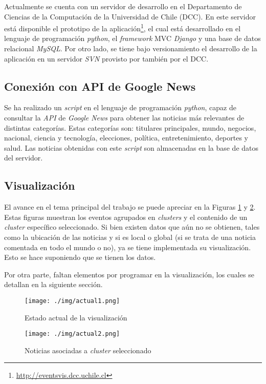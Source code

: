 \documentclass[10pt]{article}
\begin{document}
	Actualmente se cuenta con un servidor de desarrollo en el Departamento de Ciencias de la Computación de la Universidad de Chile (DCC). En este servidor está disponible el prototipo de la aplicación\footnote{\url{http://eventsvis.dcc.uchile.cl}}, el cual está desarrollado en el lenguaje de programación \emph{python}, el \emph{framework} MVC \emph{Django} y una base de datos relacional \emph{MySQL}. Por otro lado, se tiene bajo versionamiento el desarrollo de la aplicación en un servidor \emph{SVN} provisto por también por el DCC.

\subsection{Conexión con API de Google News}

Se ha realizado un \emph{script} en el lenguaje de programación \emph{python}, capaz de consultar la \emph{API} de \emph{Google News} para obtener las noticias más relevantes de distintas categorías. Estas categorías son: titulares principales, mundo, negocios, nacional, ciencia y tecnología, elecciones, política, entretenimiento, deportes y salud. Las noticias obtenidas con este \emph{script} son almacenadas en la base de datos del servidor.

\subsection{Visualización}

	El avance en el tema principal del trabajo se puede apreciar en la Figuras \ref{actual1} y  \ref{actual2}. Estas figuras muestran los eventos agrupados en \emph{clusters} y el contenido de un \emph{cluster} específico seleccionado. Si bien existen datos que aún no se obtienen, tales como la ubicación de las noticias y si es local o global (si se trata de una noticia comentada en todo el mundo o no), ya se tiene implementada su visualización. Esto se hace suponiendo que se tienen los datos.

	Por otra parte, faltan elementos por programar en la visualización, los cuales se detallan en la siguiente sección.

\begin{figure}[h!]
	\centering
    \texttt{[image: ./img/actual1.png]}
	\caption{Estado actual de la visualización}
	\label{actual1}
\end{figure}

\begin{figure}[h!]
	\centering
    \texttt{[image: ./img/actual2.png]}
	\caption{Noticias asociadas a \emph{cluster} seleccionado}
	\label{actual2}
\end{figure}
\end{document}
